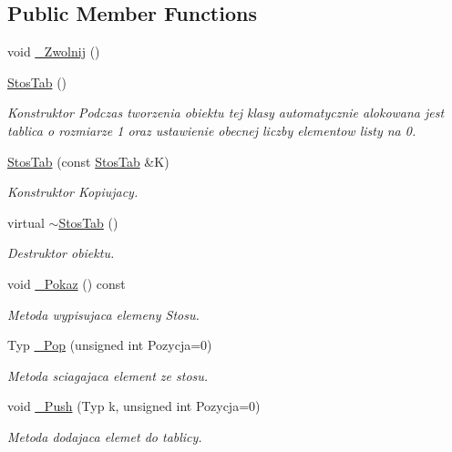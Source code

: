 \subsection*{Public Member Functions}
\begin{DoxyCompactItemize}
\item 
void \hyperlink{class_stos_tab_aec0cb259c6f044fa7d3b367dc1baca5c}{\-\_\-\-Zwolnij} ()
\item 
\hyperlink{class_stos_tab_a347bc350ea6ff8ad86b853895db5e7a9}{Stos\-Tab} ()
\begin{DoxyCompactList}\small\item\em Konstruktor Podczas tworzenia obiektu tej klasy automatycznie alokowana jest tablica o rozmiarze 1 oraz ustawienie obecnej liczby elementow listy na 0. \end{DoxyCompactList}\item 
\hyperlink{class_stos_tab_a5972345c1b71597d11330f8953dec03d}{Stos\-Tab} (const \hyperlink{class_stos_tab}{Stos\-Tab} \&K)
\begin{DoxyCompactList}\small\item\em Konstruktor Kopiujacy. \end{DoxyCompactList}\item 
virtual \hyperlink{class_stos_tab_a580b0a918a829377698f475a5f75457b}{$\sim$\-Stos\-Tab} ()
\begin{DoxyCompactList}\small\item\em Destruktor obiektu. \end{DoxyCompactList}\item 
void \hyperlink{class_stos_tab_a1b3c30902f28bf819ea5864c85ebede9}{\-\_\-\-Pokaz} () const 
\begin{DoxyCompactList}\small\item\em Metoda wypisujaca elemeny Stosu. \end{DoxyCompactList}\item 
Typ \hyperlink{class_stos_tab_a43e5e031570e69dc27fc11feca969645}{\-\_\-\-Pop} (unsigned int Pozycja=0)
\begin{DoxyCompactList}\small\item\em Metoda sciagajaca element ze stosu. \end{DoxyCompactList}\item 
void \hyperlink{class_stos_tab_a73c95fc8151510c21c5567e85296ea31}{\-\_\-\-Push} (Typ k, unsigned int Pozycja=0)
\begin{DoxyCompactList}\small\item\em Metoda dodajaca elemet do tablicy. \end{DoxyCompactList}\item 

\end{DoxyCompactItemize}
